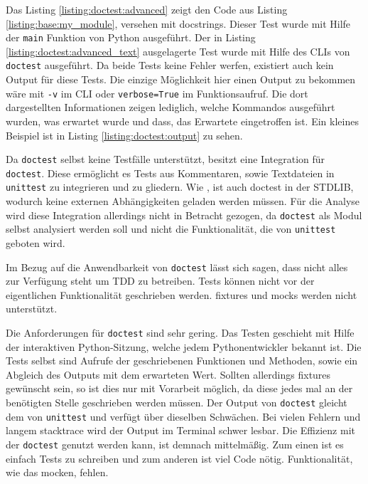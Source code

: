 Das Listing \ref{listing:doctest:advanced} zeigt den Code aus Listing
\ref{listing:base:my_module}, versehen mit \Glspl{docstring}. Dieser Test wurde
mit Hilfe der \lstinline{main} Funktion von Python ausgeführt. Der in Listing
\ref{listing:doctest:advanced_text} ausgelagerte Test wurde mit Hilfe des CLIs
von \lstinline{doctest} ausgeführt. Da beide Tests keine Fehler werfen, 
existiert auch kein Output für diese Tests.
Die einzige Möglichkeit hier einen Output zu bekommen wäre mit \lstinline{-v} im
CLI oder \lstinline{verbose=True} im Funktionsaufruf. Die dort dargestellten
Informationen zeigen lediglich, welche Kommandos ausgeführt wurden, was erwartet
wurde und dass, das Erwartete eingetroffen ist. Ein kleines Beispiel ist in
Listing \ref{listing:doctest:output} zu sehen.

Da \lstinline{doctest} selbst keine Testfälle unterstützt, besitzt
 eine Integration für \lstinline{doctest}.
Diese ermöglicht es Tests aus Kommentaren, sowie Textdateien in
\lstinline{unittest} zu integrieren und zu gliedern. Wie
, ist auch doctest in der STDLIB, wodurch keine
externen Abhängigkeiten geladen werden müssen. Für die Analyse wird diese 
Integration allerdings nicht in Betracht gezogen, da \lstinline{doctest} als 
Modul selbst analysiert werden soll und nicht die Funktionalität, die von 
\lstinline{unittest} geboten wird.
\newline

Im Bezug auf die Anwendbarkeit von \lstinline{doctest} lässt sich sagen, dass
nicht alles zur Verfügung steht um TDD zu betreiben. Tests können nicht vor der
eigentlichen Funktionalität geschrieben werden. \Glspl{fixture} und 
\Glspl{mock} werden nicht unterstützt.

Die Anforderungen für \lstinline{doctest} sind sehr gering. Das Testen geschieht
mit Hilfe der interaktiven Python-Sitzung, welche jedem Pythonentwickler
bekannt ist. Die Tests selbst sind Aufrufe der geschriebenen Funktionen und
Methoden, sowie ein Abgleich des Outputs mit dem erwarteten Wert. Sollten
allerdings \Glspl{fixture} gewünscht sein, so ist dies nur mit Vorarbeit
möglich, da diese jedes mal an der benötigten Stelle geschrieben werden müssen.
Der Output von \lstinline{doctest} gleicht dem von \lstinline{unittest} und
verfügt über dieselben Schwächen. Bei vielen Fehlern und langem
\gls{stacktrace} wird der Output im Terminal schwer lesbar. Die Effizienz mit
der \lstinline{doctest} genutzt werden kann, ist demnach mittelmäßig. Zum einen
ist es einfach Tests zu schreiben und zum anderen ist viel Code nötig.
Funktionalität, wie das \gls{mock}en, fehlen.

